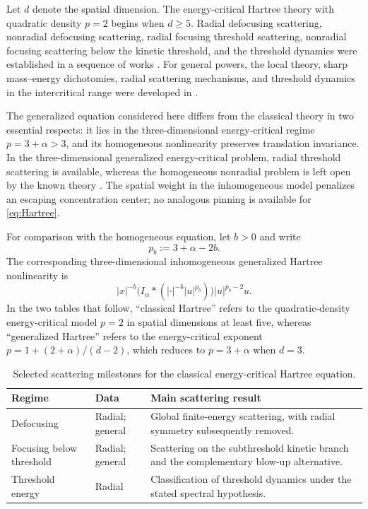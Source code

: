 \documentclass[preprint,12pt]{elsarticle}
\numberwithin{equation}{section}
\theoremstyle{remark}
\begin{document}
Let $d$ denote the spatial dimension. The energy-critical Hartree theory with quadratic density $p=2$ begins when $d\ge5$.  Radial defocusing scattering, nonradial defocusing scattering, radial focusing threshold scattering, nonradial focusing scattering below the kinetic threshold, and the threshold dynamics were established in a sequence of works \cite{MiaoXuZhao2007,MiaoXuZhao2011,MiaoXuZhao2009,LiMiaoZhang2009,MiaoWuXu2015}.  For general powers, the local theory, sharp mass--energy dichotomies, radial scattering mechanisms, and threshold dynamics in the intercritical range were developed in \cite{Arora2019,AroraRoudenko2020,AroraRoudenko2022,Zhou2025}.

The generalized equation considered here differs from the classical theory in two essential respects: it lies in the three-dimensional energy-critical regime $p=3+\alpha>3$, and its homogeneous nonlinearity preserves translation invariance.  In the three-dimensional generalized energy-critical problem, radial threshold scattering is available, whereas the homogeneous nonradial problem is left open by the known theory \cite{GuzmanXu2023}.  The spatial weight in the inhomogeneous model penalizes an escaping concentration center; no analogous pinning is available for \eqref{eq:Hartree}.

For comparison with the homogeneous equation, let $b>0$ and write
\begin{equation*}
  p_b:=3+\alpha-2b.
\end{equation*}
The corresponding three-dimensional inhomogeneous generalized Hartree nonlinearity is
\[
  |x|^{-b}\bigl(I_\alpha*(|\cdot|^{-b}|u|^{p_b})\bigr)|u|^{p_b-2}u.
\]
In the two tables that follow, ``classical Hartree'' refers to the quadratic-density energy-critical model $p=2$ in spatial dimensions at least five, whereas ``generalized Hartree'' refers to the energy-critical exponent $p=1+(2+\alpha)/(d-2)$, which reduces to $p=3+\alpha$ when $d=3$.

\begin{table}[H]
\centering
\caption{Selected scattering milestones for the classical energy-critical Hartree equation.}
\label{tab:classical-scattering-progress}
\small
\setlength{\tabcolsep}{4pt}
\renewcommand{\arraystretch}{1.10}
\begin{tabularx}{\textwidth}{@{}L{0.24\textwidth}L{0.18\textwidth}Y@{}}
\toprule
Regime & Data & Main scattering result \\
\midrule
Defocusing \cite{MiaoXuZhao2007,MiaoXuZhao2011}
& Radial; general
& Global finite-energy scattering, with radial symmetry subsequently removed. \\
Focusing below threshold \cite{MiaoXuZhao2009,LiMiaoZhang2009}
& Radial; general
& Scattering on the subthreshold kinetic branch and the complementary blow-up alternative. \\
Threshold energy \cite{MiaoWuXu2015}
& Radial
& Classification of threshold dynamics under the stated spectral hypothesis. \\
\bottomrule
\end{tabularx}
\end{table}
\end{document}
